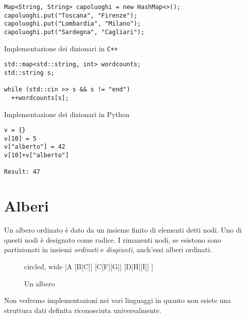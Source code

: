 \begin{listing}[H]
%
\label{lst:java-dictionary}
\begin{verbatim}
Map<String, String> capoluoghi = new HashMap<>();
capoluoghi.put("Toscana", "Firenze");
capoluoghi.put("Lombardia", "Milano");
capoluoghi.put("Sardegna", "Cagliari");
\end{verbatim}
\end{listing}
\vspace{-10pt}

\begin{listing}[H]
\caption{Implementazione dei dizionari in \texttt{C++}}%
\label{lst:cpp-dictionary}
\begin{verbatim}
std::map<std::string, int> wordcounts;
std::string s;

while (std::cin >> s && s != "end")
  ++wordcounts[s];
\end{verbatim}
\end{listing}
\vspace{-10pt}

\begin{listing}[H]
\caption{Implementazione dei dizionari in Python}%
\label{lst:python-dictionary}
\begin{verbatim}
v = {}
v[10] = 5
v["alberto"] = 42
v[10]+v["alberto"]

Result: 47
\end{verbatim}
\end{listing}
\vspace{-10pt}

\section{Alberi}

Un albero ordinato è dato da un insieme finito di elementi detti nodi.
Uno di questi nodi è designato come radice.
I rimanenti nodi, se esistono sono partizionati in insiemi \emph{ordinati} e \emph{disgiunti}, anch'essi alberi ordinati.

\begin{figure}[H]
	\centering
	\begin{forest} circled, wide
	[A
		[B[C]]
		[C[F][G]]
		[D[H][I]]
	]
	\end{forest}
	\caption[]{Un albero}
\end{figure}

Non vedremo implementazioni nei vari linguaggi in quanto non esiste una struttura dati definita riconosciuta universalmente.

